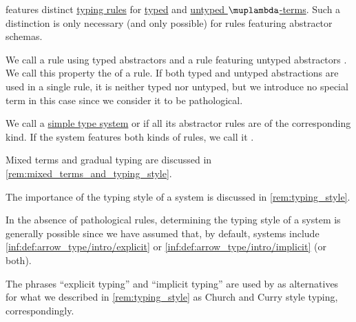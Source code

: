 \begin{definition}\label{def:simple_type_system_style}\mimprovised
   features distinct \hyperref[def:simple_typing_rule]{typing rules} for \hyperref[def:typed_lambda_term]{typed} and \hyperref[def:lambda_term]{untyped \( \muplambda \)-terms}. Such a distinction is only necessary (and only possible) for rules featuring abstractor schemas.

  We call a rule using typed abstractors  and a rule featuring untyped abstractors . We call this property the  of a rule. If both typed and untyped abstractions are used in a single rule, it is neither typed nor untyped, but we introduce no special term in this case since we consider it to be pathological.

  We call a \hyperref[def:simple_type_system]{simple type system}  or  if all its abstractor rules are of the corresponding kind. If the system features both kinds of rules, we call it .
\end{definition}
\begin{comments}
  \item Mixed terms and gradual typing are discussed in \cref{rem:mixed_terms_and_typing_style}.

  \item The importance of the typing style of a system is discussed in \cref{rem:typing_style}.

  \item In the absence of pathological rules, determining the typing style of a system is generally possible since we have assumed that, by default, systems include \ref{inf:def:arrow_type/intro/explicit} or \ref{inf:def:arrow_type/intro/implicit} (or both).

  \item The phrases \enquote{explicit typing} and \enquote{implicit typing} are used by \textcite[119]{Barendregt1992LambdaCalculiWithTypes} as alternatives for what we described in \cref{rem:typing_style} as Church and Curry style typing, correspondingly.
\end{comments}

